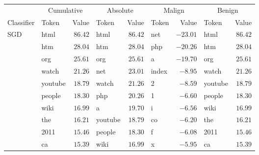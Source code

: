 \begin{table}[htb]
    \centering

    \begin{tabular}{llrlrlrlr}
        \toprule
                                & \multicolumn{2}{c}{Cumulative}    & \multicolumn{2}{c}{Absolute}  & \multicolumn{2}{c}{Malign}    & \multicolumn{2}{c}{Benign}    \\ \cmidrule(lr){2-3} \cmidrule(lr){4-5} \cmidrule(lr){6-7} \cmidrule(lr){8-9}
        Classifier              & Token     & Value                 & Token     & Value             & Token    & Value              & Token     & Value             \\
        \midrule
        \multirow{10}{*}{SGD}   & html      & \( 86.42 \)           & html      & \( 86.42 \)       & net      & \( -23.01 \)       & html      & \( 86.42 \)       \\
                                & htm       & \( 28.04 \)           & htm       & \( 28.04 \)       & php      & \( -20.26 \)       & htm       & \( 28.04 \)       \\
                                & org       & \( 25.61 \)           & org       & \( 25.61 \)       & a        & \( -19.70 \)       & org       & \( 25.61 \)       \\
                                & watch     & \( 21.26 \)           & net       & \( 23.01 \)       & index    & \( -8.95 \)        & watch     & \( 21.26 \)       \\
                                & youtube   & \( 18.79 \)           & watch     & \( 21.26 \)       & 2        & \( -8.59 \)        & youtube   & \( 18.79 \)       \\
                                & people    & \( 18.30 \)           & php       & \( 20.26 \)       & 1        & \( -6.60 \)        & people    & \( 18.30 \)       \\
                                & wiki      & \( 16.99 \)           & a         & \( 19.70 \)       & i        & \( -6.56 \)        & wiki      & \( 16.99 \)       \\
                                & the       & \( 16.21 \)           & youtube   & \( 18.79 \)       & co       & \( -6.20 \)        & the       & \( 16.21 \)       \\
                                & 2011      & \( 15.46 \)           & people    & \( 18.30 \)       & f        & \( -6.08 \)        & 2011      & \( 15.46 \)       \\
                                & ca        & \( 15.39 \)           & wiki      & \( 16.99 \)       & x        & \( -5.95 \)        & ca        & \( 15.39 \)       \\

\end{tabular}
\end{table}
